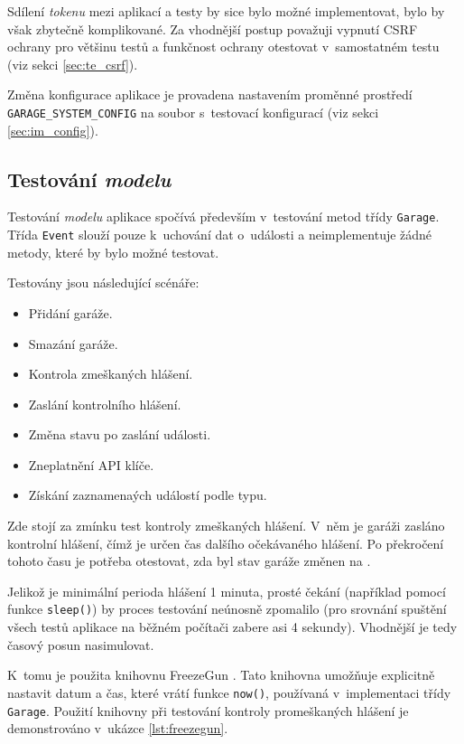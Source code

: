 Sdílení \textit{tokenu} mezi aplikací a testy by sice bylo možné implementovat, bylo by však zbytečně komplikované. Za vhodnější postup považuji vypnutí CSRF ochrany pro většinu testů a funkčnost ochrany otestovat v~samostatném testu (viz sekci \ref{sec:te_csrf}).

Změna konfigurace aplikace je provadena nastavením proměnné prostředí \texttt{GARAGE\_SYSTEM\_CONFIG} na soubor s~testovací konfigurací (viz sekci \ref{sec:im_config}).

\subsection{Testování \textit{modelu}}
\label{sec:te_model}

Testování \textit{modelu} aplikace spočívá především v~testování metod třídy \texttt{Garage}. Třída \texttt{Event} slouží pouze k~uchování dat o~události a neimplementuje žádné metody, které by bylo možné testovat.

Testovány jsou následující scénáře:

\begin{itemize}
    \item Přidání garáže.
    \item Smazání garáže.
    \item Kontrola zmeškaných hlášení.
    \item Zaslání kontrolního hlášení.
    \item Změna stavu po zaslání události.
    \item Zneplatnění API klíče.
    \item Získání zaznamenaých událostí podle typu.
\end{itemize}

Zde stojí za zmínku test kontroly zmeškaných hlášení. V~něm je garáži zasláno kontrolní hlášení, čímž je určen čas dalšího očekávaného hlášení. Po překročení tohoto času je potřeba otestovat, zda byl stav garáže změnen na .

Jelikož je minimální perioda hlášení 1 minuta, prosté čekání (například pomocí funkce \texttt{sleep()}) by proces testování neúnosně zpomalilo (pro srovnání spuštění všech testů aplikace na běžném počítači zabere asi 4 sekundy). Vhodnější je tedy časový posun nasimulovat.

K~tomu je použita knihovnu FreezeGun \cite{freezegun}. Tato knihovna umožňuje explicitně nastavit datum a čas, které vrátí funkce \texttt{now()}, používaná v~implementaci třídy \texttt{Garage}. Použití knihovny při testování kontroly promeškaných hlášení je demonstrováno v~ukázce \ref{lst:freezegun}.


